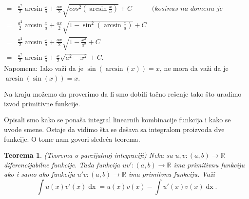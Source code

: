 \documentclass{article}
\newtheorem{teorema}{Teorema}[section]
\DeclareMathOperator{\dx}{dx}
\begin{document}
\begin{primbox}
\begin{align*}
        = & \frac{a^2}{2}\arcsin\frac{x}{a} + \frac{a x}{2}\sqrt{cos^2\left(\arcsin\frac{x}{a}\right)} + C                            & \textit{(kosinus na domenu je pozitivan)}           \\
        = & \frac{a^2}{2}\arcsin\frac{x}{a} + \frac{a x}{2}\sqrt{1-\sin^2\left(\arcsin\frac{x}{a}\right)} + C                         &                                                     \\
        = & \frac{a^2}{2}\arcsin\frac{x}{a} + \frac{a x}{2}\sqrt{1-\frac{x^2}{a^2}} + C                                               &                                                     \\
        = & \frac{a^2}{2}\arcsin\frac{x}{a} + \frac{x}{2}\sqrt{a^2-x^2} + C.                                                          &
    \end{align*}
    \label{napomena_1_primer_1.9}Napomena: Iako važi da je $\sin\left(\arcsin\left(x\right)\right)=x$, ne mora da važi da je $\arcsin\left(\sin\left(x\right)\right)=x$.\par
    Na kraju možemo da proverimo da li smo dobili tačno rešenje tako što uradimo izvod primitivne funkcije.
\end{primbox}

Opisali smo kako se ponaša integral linearnih kombinacije funkcija i kako se uvode smene. Ostaje da vidimo
šta se dešava sa integralom proizvoda dve funkcije. O tome nam govori sledeća teorema.

\begin{teoremabox}
    \label{teorema_1.4}
    \begin{teorema}
        (Teorema o parcijalnoj integraciji) Neka su
        $u, v: \left(a, b\right) \longrightarrow \mathbb{R}$ diferencijabilne
        funkcije. Tada funkcija $u v':\left(a, b\right) \longrightarrow \mathbb{R}$
        ima primitivnu funkciju ako i samo ako funkcija $u' v: \left(a, b\right) \longrightarrow \mathbb{R}$
        ima primitvnu funkciju. Važi
        $$\int u\left(x\right)v'\left(x\right)\dx = u\left(x\right)v\left(x\right) -\int u'\left(x\right)v\left(x\right)\dx.$$
    \end{teorema}
\end{teoremabox}
\end{document}
